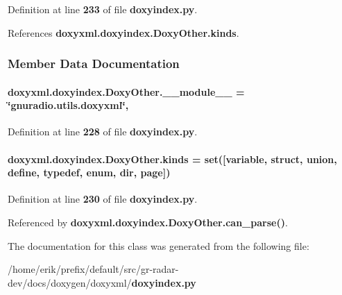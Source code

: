 Definition at line {\bf 233} of file {\bf doxyindex.\+py}.



References {\bf doxyxml.\+doxyindex.\+Doxy\+Other.\+kinds}.



\subsubsection{Member Data Documentation}
\paragraph[{\+\_\+\+\_\+module\+\_\+\+\_\+}]{ doxyxml.\+doxyindex.\+Doxy\+Other.\+\_\+\+\_\+module\+\_\+\+\_\+ = \char`\"{}gnuradio.\+utils.\+doxyxml\char`\"{}\hspace{0.3cm}{\ttfamily [static]}, {\ttfamily [private]}}\label{classdoxyxml_1_1doxyindex_1_1DoxyOther_ade4280689a25a52c939799f3de2a58f9}


Definition at line {\bf 228} of file {\bf doxyindex.\+py}.

\paragraph[{kinds}]{\setlength{\rightskip}{0pt plus 5cm}doxyxml.\+doxyindex.\+Doxy\+Other.\+kinds = {\bf set}([\textquotesingle{}variable\textquotesingle{}, \textquotesingle{}struct\textquotesingle{}, \textquotesingle{}union\textquotesingle{}, \textquotesingle{}define\textquotesingle{}, \textquotesingle{}typedef\textquotesingle{}, \textquotesingle{}enum\textquotesingle{}, \textquotesingle{}dir\textquotesingle{}, \textquotesingle{}page\textquotesingle{}])\hspace{0.3cm}{\ttfamily [static]}}\label{classdoxyxml_1_1doxyindex_1_1DoxyOther_adabd01819b87b4245df75fadd7211703}


Definition at line {\bf 230} of file {\bf doxyindex.\+py}.



Referenced by {\bf doxyxml.\+doxyindex.\+Doxy\+Other.\+can\+\_\+parse()}.



The documentation for this class was generated from the following file\+:\begin{DoxyCompactItemize}
\item 
/home/erik/prefix/default/src/gr-\/radar-\/dev/docs/doxygen/doxyxml/{\bf doxyindex.\+py}\end{DoxyCompactItemize}
